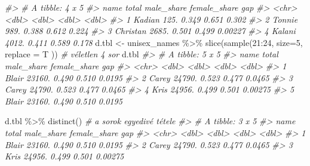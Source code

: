 \documentclass[
]{book}
\newenvironment{Shaded}{\begin{snugshade}}{\end{snugshade}}
\newcommand{\AttributeTok}[1]{\textcolor[rgb]{0.77,0.63,0.00}{#1}}
\newcommand{\CommentTok}[1]{\textcolor[rgb]{0.56,0.35,0.01}{\textit{#1}}}
\newcommand{\DecValTok}[1]{\textcolor[rgb]{0.00,0.00,0.81}{#1}}
\newcommand{\FunctionTok}[1]{\textcolor[rgb]{0.00,0.00,0.00}{#1}}
\newcommand{\NormalTok}[1]{#1}
\newcommand{\OtherTok}[1]{\textcolor[rgb]{0.56,0.35,0.01}{#1}}
\newcommand{\SpecialCharTok}[1]{\textcolor[rgb]{0.00,0.00,0.00}{#1}}
\begin{document}
\begin{Shaded}
\begin{Highlighting}[]
\CommentTok{\#\textgreater{} \# A tibble: 4 x 5}
\CommentTok{\#\textgreater{}   name     total male\_share female\_share     gap}
\CommentTok{\#\textgreater{}   \textless{}chr\textgreater{}    \textless{}dbl\textgreater{}      \textless{}dbl\textgreater{}        \textless{}dbl\textgreater{}   \textless{}dbl\textgreater{}}
\CommentTok{\#\textgreater{} 1 Kadian    125.      0.349        0.651 0.302  }
\CommentTok{\#\textgreater{} 2 Tonnie    989.      0.388        0.612 0.224  }
\CommentTok{\#\textgreater{} 3 Christan 2685.      0.501        0.499 0.00227}
\CommentTok{\#\textgreater{} 4 Kalani   4012.      0.411        0.589 0.178}
\NormalTok{d.tbl }\OtherTok{\textless{}{-}}\NormalTok{ unisex\_names }\SpecialCharTok{\%\textgreater{}\%} \FunctionTok{slice}\NormalTok{(}\FunctionTok{sample}\NormalTok{(}\DecValTok{21}\SpecialCharTok{:}\DecValTok{24}\NormalTok{, }\AttributeTok{size=}\DecValTok{5}\NormalTok{, }\AttributeTok{replace =}\NormalTok{ T )) }\CommentTok{\# véletlen 4 sor}
\NormalTok{d.tbl}
\CommentTok{\#\textgreater{} \# A tibble: 5 x 5}
\CommentTok{\#\textgreater{}   name   total male\_share female\_share     gap}
\CommentTok{\#\textgreater{}   \textless{}chr\textgreater{}  \textless{}dbl\textgreater{}      \textless{}dbl\textgreater{}        \textless{}dbl\textgreater{}   \textless{}dbl\textgreater{}}
\CommentTok{\#\textgreater{} 1 Blair 23160.      0.490        0.510 0.0195 }
\CommentTok{\#\textgreater{} 2 Carey 24790.      0.523        0.477 0.0465 }
\CommentTok{\#\textgreater{} 3 Carey 24790.      0.523        0.477 0.0465 }
\CommentTok{\#\textgreater{} 4 Kris  24956.      0.499        0.501 0.00275}
\CommentTok{\#\textgreater{} 5 Blair 23160.      0.490        0.510 0.0195}

\NormalTok{d.tbl }\SpecialCharTok{\%\textgreater{}\%} \FunctionTok{distinct}\NormalTok{()   }\CommentTok{\# a sorok egyedivé tétele}
\CommentTok{\#\textgreater{} \# A tibble: 3 x 5}
\CommentTok{\#\textgreater{}   name   total male\_share female\_share     gap}
\CommentTok{\#\textgreater{}   \textless{}chr\textgreater{}  \textless{}dbl\textgreater{}      \textless{}dbl\textgreater{}        \textless{}dbl\textgreater{}   \textless{}dbl\textgreater{}}
\CommentTok{\#\textgreater{} 1 Blair 23160.      0.490        0.510 0.0195 }
\CommentTok{\#\textgreater{} 2 Carey 24790.      0.523        0.477 0.0465 }
\CommentTok{\#\textgreater{} 3 Kris  24956.      0.499        0.501 0.00275}



\end{Highlighting}
\end{Shaded}
\end{document}
